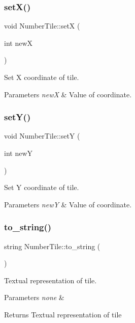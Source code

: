 \subsubsection{\texorpdfstring{set\+X()}{setX()}}
{\footnotesize\ttfamily void Number\+Tile\+::setX (\begin{DoxyParamCaption}\item[{int}]{newX }\end{DoxyParamCaption})}

Set X coordinate of tile.


\begin{DoxyParams}{Parameters}
{\em newX} & Value of coordinate. \\
\hline
\end{DoxyParams}
\mbox{\label{classNumberTile_afbe34f51da300bc1fd9eed4cb9cd47fa}} 
\subsubsection{\texorpdfstring{set\+Y()}{setY()}}
{\footnotesize\ttfamily void Number\+Tile\+::setY (\begin{DoxyParamCaption}\item[{int}]{newY }\end{DoxyParamCaption})}

Set Y coordinate of tile.


\begin{DoxyParams}{Parameters}
{\em newY} & Value of coordinate. \\
\hline
\end{DoxyParams}
\mbox{\label{classNumberTile_af33e3c4937201c189e901615816b0e3c}} 
\subsubsection{\texorpdfstring{to\+\_\+string()}{to\_string()}}
{\footnotesize\ttfamily string Number\+Tile\+::to\+\_\+string (\begin{DoxyParamCaption}{ }\end{DoxyParamCaption})}

Textual representation of tile.


\begin{DoxyParams}{Parameters}
{\em none} & \\
\hline
\end{DoxyParams}
\begin{DoxyReturn}{Returns}
Textual representation of tile 
\end{DoxyReturn}


